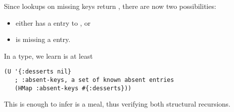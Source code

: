 Since lookups on missing keys return , there are
now two possibilities:
\begin{itemize}
  \item either  has a  entry to , or
  \item {} is missing a  entry.
\end{itemize}
In a type, we learn  is at least
\begin{verbatim}
(U '{:desserts nil}
   ; :absent-keys, a set of known absent entries
   (HMap :absent-keys #{:desserts}))
\end{verbatim}

This is enough to infer  is a  meal, thus verifying both
structural recursions.

%
%

